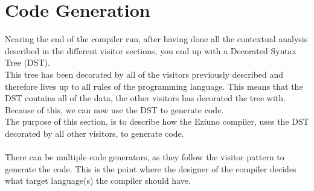 \section{Code Generation}
Nearing the end of the compiler run, after having done all the contextual analysis described in the different visitor sections, you end up with a Decorated Syntax Tree (DST).\\
This tree has been decorated by all of the visitors previously described and therefore lives up to all rules of the programming language. This means that the DST contains all of the data, the other visitors has decorated the tree with. Because of this, we can now use the DST to generate code.\\
The purpose of this section, is to describe how the Eziuno compiler, uses the DST decorated by all other visitors, to generate code.
\\\\
There can be multiple code generators, as they follow the visitor pattern to generate the code. This is the point where the designer of the compiler decides what target language(s) the compiler should have.

